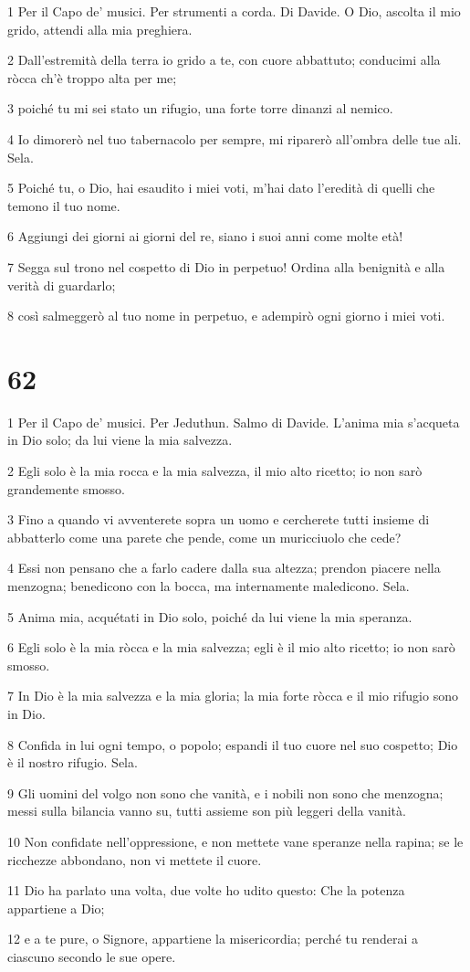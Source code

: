 \par 1 Per il Capo de' musici. Per strumenti a corda. Di Davide. O Dio, ascolta il mio grido, attendi alla mia preghiera.
\par 2 Dall'estremità della terra io grido a te, con cuore abbattuto; conducimi alla ròcca ch'è troppo alta per me;
\par 3 poiché tu mi sei stato un rifugio, una forte torre dinanzi al nemico.
\par 4 Io dimorerò nel tuo tabernacolo per sempre, mi riparerò all'ombra delle tue ali. Sela.
\par 5 Poiché tu, o Dio, hai esaudito i miei voti, m'hai dato l'eredità di quelli che temono il tuo nome.
\par 6 Aggiungi dei giorni ai giorni del re, siano i suoi anni come molte età!
\par 7 Segga sul trono nel cospetto di Dio in perpetuo! Ordina alla benignità e alla verità di guardarlo;
\par 8 così salmeggerò al tuo nome in perpetuo, e adempirò ogni giorno i miei voti.

\chapter{62}

\par 1 Per il Capo de' musici. Per Jeduthun. Salmo di Davide. L'anima mia s'acqueta in Dio solo; da lui viene la mia salvezza.
\par 2 Egli solo è la mia rocca e la mia salvezza, il mio alto ricetto; io non sarò grandemente smosso.
\par 3 Fino a quando vi avventerete sopra un uomo e cercherete tutti insieme di abbatterlo come una parete che pende, come un muricciuolo che cede?
\par 4 Essi non pensano che a farlo cadere dalla sua altezza; prendon piacere nella menzogna; benedicono con la bocca, ma internamente maledicono. Sela.
\par 5 Anima mia, acquétati in Dio solo, poiché da lui viene la mia speranza.
\par 6 Egli solo è la mia ròcca e la mia salvezza; egli è il mio alto ricetto; io non sarò smosso.
\par 7 In Dio è la mia salvezza e la mia gloria; la mia forte ròcca e il mio rifugio sono in Dio.
\par 8 Confida in lui ogni tempo, o popolo; espandi il tuo cuore nel suo cospetto; Dio è il nostro rifugio. Sela.
\par 9 Gli uomini del volgo non sono che vanità, e i nobili non sono che menzogna; messi sulla bilancia vanno su, tutti assieme son più leggeri della vanità.
\par 10 Non confidate nell'oppressione, e non mettete vane speranze nella rapina; se le ricchezze abbondano, non vi mettete il cuore.
\par 11 Dio ha parlato una volta, due volte ho udito questo: Che la potenza appartiene a Dio;
\par 12 e a te pure, o Signore, appartiene la misericordia; perché tu renderai a ciascuno secondo le sue opere.


